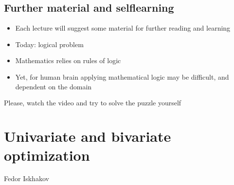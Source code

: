 \documentclass[letterpaper,10pt,english]{jupyterBook}
\begin{document}
\section{Further material and self\sphinxhyphen{}learning}
\label{\detokenize{01.introduction:further-material-and-self-learning}}\begin{itemize}
\item {} 
\sphinxAtStartPar
Each lecture will suggest some material for further reading and learning

\item {} 
\sphinxAtStartPar
Today:  logical problem

\item {} 
\sphinxAtStartPar
Mathematics relies on rules of logic

\item {} 
\sphinxAtStartPar
Yet, for human brain applying mathematical logic may be difficult, and dependent on the domain

\end{itemize}

\sphinxAtStartPar
Please, watch the video and try to solve the puzzle yourself

\sphinxstepscope


\chapter{Univariate and bivariate optimization}
\label{\detokenize{02.optimization_intro:univariate-and-bivariate-optimization}}\label{\detokenize{02.optimization_intro::doc}}
\sphinxAtStartPar
{}
Fedor Iskhakov
\end{document}
